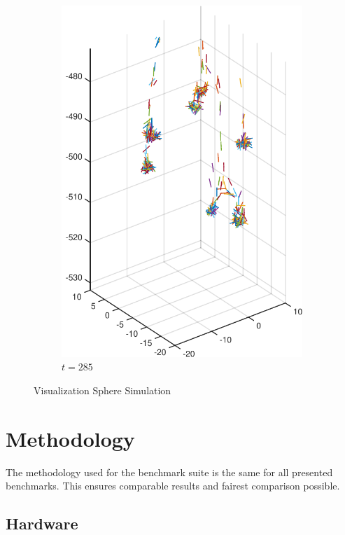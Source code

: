 \documentclass[a4paper,11pt]{kth-mag}
\begin{document}
\begin{figure}
\begin{subfigure}[h]{0.4\textwidth}
    \includegraphics[width=\textwidth]{img/sphere_00250.pdf}
    \caption{$t=285$}\label{fig:sphere_simulation_1d}
  \end{subfigure}
  \caption{Visualization Sphere Simulation}
  \label{fig:sphere_simulation}
\end{figure}

\section{Methodology}

The methodology used for the benchmark suite is the same for all presented benchmarks. This ensures comparable results and fairest comparison possible.

\subsection{Hardware}
\end{document}
